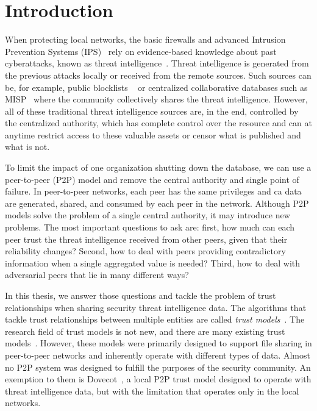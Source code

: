\chapter{Introduction}
\label{ch:introduction}



When protecting local networks, the basic firewalls and advanced Intrusion Prevention Systems (IPS)~\cite{zhang2004intrusion} rely on evidence-based knowledge about past cyberattacks, known as threat intelligence~\cite{threatintelligence}. Threat intelligence is generated from the previous attacks locally or received from the remote sources.
Such sources can be, for example, public blocklists ~\cite{abuseipdb, dataplane, binarydefense} or centralized collaborative databases such as MISP~\cite{wagner2016misp} where the community collectively shares the threat intelligence.
However, all of these traditional threat intelligence sources are, in the end, controlled by the centralized authority, which has complete control over the resource and can at anytime restrict access to these valuable assets or censor what is published and what is not.

To limit the impact of one organization shutting down the database, we can use a peer-to-peer (P2P) model and remove the central authority and single point of failure.
In peer-to-peer networks, each peer has the same privileges and ca data are generated, shared, and consumed by each peer in the network.
Although P2P models solve the problem of a single central authority, it may introduce new problems. The most important questions to ask are: first, how much can each peer trust the threat intelligence received from other peers, given that their reliability changes? Second, how to deal with peers providing contradictory information when a single aggregated value is needed? Third, how to deal with adversarial peers that lie in many different ways?

In this thesis, we answer those questions and tackle the problem of trust relationships when sharing security threat intelligence data.
The algorithms that tackle trust relationships between multiple entities are called \textit{trust models}~\cite{wang2003trust}.
The research field of trust models is not new, and there are many existing trust models~\cite{abera2019sadan, sort, christensen2014hybrid, 1562680, huynh2006integrated, kamvar2003eigentrust, li2014design, pinyol2013computational, xiong2004peertrust}.
However, these models were primarily designed to support file sharing in peer-to-peer networks and inherently operate with different types of data. Almost no P2P system was designed to fulfill the purposes of the security community.
An exemption to them is Dovecot~\cite{dita}, a local P2P trust model designed to operate with threat intelligence data, but with the limitation that operates only in the local networks.

